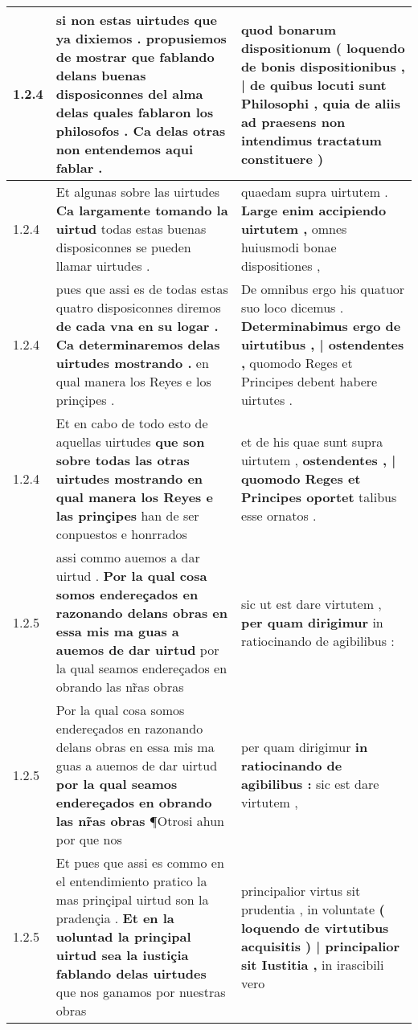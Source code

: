 \begin{tabular}{|p{1cm}|p{6.5cm}|p{6.5cm}|}
1.2.4 & si non estas uirtudes que ya dixiemos . \textbf{ propusiemos de mostrar que fablando delans buenas disposiconnes del alma delas quales fablaron los philosofos . } Ca delas otras non entendemos aqui fablar . & quod bonarum dispositionum \textbf{ ( loquendo de bonis dispositionibus , | de quibus locuti sunt Philosophi , } quia de aliis ad praesens non intendimus tractatum constituere ) \\\hline
1.2.4 & Et algunas sobre las uirtudes \textbf{ Ca largamente tomando la uirtud } todas estas buenas disposiconnes se pueden llamar uirtudes . & quaedam supra uirtutem . \textbf{ Large enim accipiendo uirtutem , } omnes huiusmodi bonae dispositiones , \\\hline
1.2.4 & pues que assi es de todas estas quatro disposiconnes diremos \textbf{ de cada vna en su logar . Ca determinaremos delas uirtudes mostrando . } en qual manera los Reyes e los prinçipes . & De omnibus ergo his quatuor suo loco dicemus . \textbf{ Determinabimus ergo de uirtutibus , | ostendentes , } quomodo Reges et Principes debent habere uirtutes . \\\hline
1.2.4 & Et en cabo de todo esto de aquellas uirtudes \textbf{ que son sobre todas las otras uirtudes mostrando en qual manera los Reyes e las prinçipes } han de ser conpuestos e honrrados & et de his quae sunt supra uirtutem , \textbf{ ostendentes , | quomodo Reges et Principes oportet } talibus esse ornatos . \\\hline
1.2.5 & assi commo auemos a dar uirtud . \textbf{ Por la qual cosa somos endereçados en razonando delans obras en essa mis ma guas a auemos de dar uirtud } por la qual seamos endereçados en obrando las nr̃as obras & sic ut est dare virtutem , \textbf{ per quam dirigimur } in ratiocinando de agibilibus : \\\hline
1.2.5 & Por la qual cosa somos endereçados en razonando delans obras en essa mis ma guas a auemos de dar uirtud \textbf{ por la qual seamos endereçados en obrando las nr̃as obras } ¶Otrosi ahun por que nos & per quam dirigimur \textbf{ in ratiocinando de agibilibus : } sic est dare virtutem , \\\hline
1.2.5 & Et pues que assi es commo en el entendimiento pratico la mas prinçipal uirtud son la pradençia . \textbf{ Et en la uoluntad la prinçipal uirtud sea la iustiçia fablando delas uirtudes } que nos ganamos por nuestras obras & principalior virtus sit prudentia , in voluntate \textbf{ ( loquendo de virtutibus acquisitis ) | principalior sit Iustitia , } in irascibili vero \\\hline

\end{tabular}
